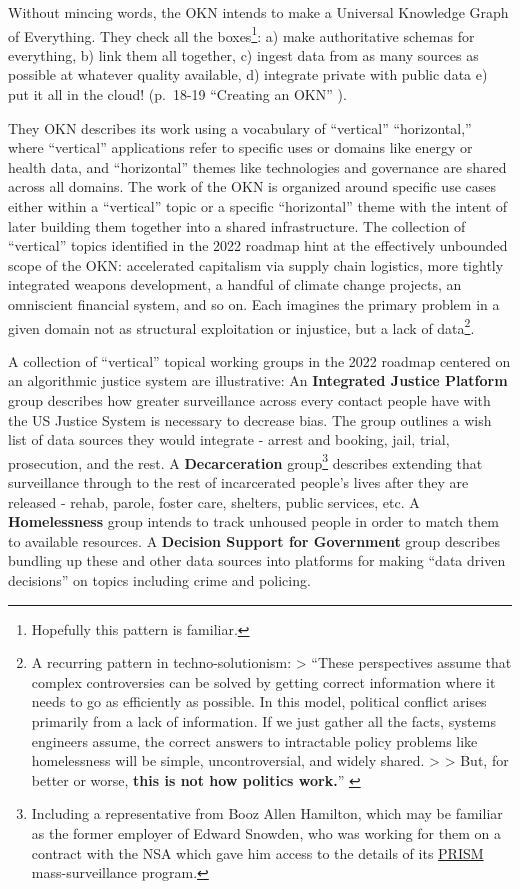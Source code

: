Without mincing words, the OKN intends to make a Universal Knowledge
Graph of Everything. They check all the boxes\footnote{Hopefully this
  pattern is familiar.}: a) make authoritative schemas for everything,
b) link them all together, c) ingest data from as many sources as
possible at whatever quality available, d) integrate private with public
data e) put it all in the cloud! (p.~18-19 ``Creating an OKN'' \cite{bigdatainteragencyworkinggroupOpenKnowledgeNetwork2018} ).

They OKN describes its work using a vocabulary of ``vertical''
``horizontal,'' where ``vertical'' applications refer to specific uses
or domains like energy or health data, and ``horizontal'' themes like
technologies and governance are shared across all domains. The work of
the OKN is organized around specific use cases either within a
``vertical'' topic or a specific ``horizontal'' theme with the intent of
later building them together into a shared infrastructure. The
collection of ``vertical'' topics identified in the 2022 roadmap hint at
the effectively unbounded scope of the OKN: accelerated capitalism via
supply chain logistics, more tightly integrated weapons development, a
handful of climate change projects, an omniscient financial system, and
so on. Each imagines the primary problem in a given domain not as
structural exploitation or injustice, but a lack of data\footnote{A
  recurring pattern in techno-solutionism: \textgreater{} ``These
  perspectives assume that complex controversies can be solved by
  getting correct information where it needs to go as efficiently as
  possible. In this model, political conflict arises primarily from a
  lack of information. If we just gather all the facts, systems
  engineers assume, the correct answers to intractable policy problems
  like homelessness will be simple, uncontroversial, and widely shared.
  \textgreater{} \textgreater{} But, for better or worse, \textbf{this
  is not how politics work.}'' \cite{eubanksAutomatingInequalityHow2019} }.

A collection of ``vertical'' topical working groups in the 2022 roadmap
centered on an algorithmic justice system are illustrative: An
\textbf{Integrated Justice Platform} group describes how greater
surveillance across every contact people have with the US Justice System
is necessary to decrease bias. The group outlines a wish list of data
sources they would integrate - arrest and booking, jail, trial,
prosecution, and the rest. A \textbf{Decarceration} group\footnote{Including
  a representative from Booz Allen Hamilton, which may be familiar as
  the former employer of Edward Snowden, who was working for them on a
  contract with the NSA which gave him access to the details of its
  \href{https://en.wikipedia.org/wiki/PRISM_(surveillance_program)}{PRISM}
  mass-surveillance program.} describes extending that surveillance
through to the rest of incarcerated people's lives after they are
released - rehab, parole, foster care, shelters, public services, etc. A
\textbf{Homelessness} group intends to track unhoused people in order to
match them to available resources. A \textbf{Decision Support for
Government} group describes bundling up these and other data sources
into platforms for making ``data driven decisions'' on topics including
crime and policing.

